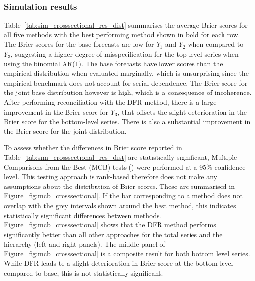 \documentclass[a4paper,review,12pt,authoryear]{elsarticle}
\theoremstyle{definition}
\begin{document}
    \subsubsection{Simulation results}
    Table~\ref{tab:sim_crosssectional_res_dist} summarises the average Brier scores for all five methods with the best performing  method shown in bold for each row. The Brier scores for the base forecasts are low for $Y_1$ and $Y_2$ when compared to $Y_3$, suggesting a higher degree of misspecification for the top level series when using the binomial AR(1). The base forecasts have lower scores than the empirical distribution when evaluated marginally, which is unsurprising since the empirical benchmark does not account for serial dependence. The Brier score for the joint base distribution however is high, which is a consequence of incoherence. After performing reconciliation with the DFR method, there is a large improvement in the Brier score for $Y_3$, that offsets the slight deterioration in the Brier score for the bottom-level series. There is also a substantial improvement in the Brier score for the joint distribution.
    
    To assess whether the differences in Brier score reported in Table~\ref{tab:sim_crosssectional_res_dist} are statistically significant, Multiple Comparisons from the Best (MCB) tests (\citealp{koningM3CompetitionStatistical2005}) were performed at a 95\% confidence level.
    This testing approach is rank-based therefore does not make any assumptions about the distribution of Brier scores. These are summarised in Figure~\ref{fig:mcb_crosssectional}. If the bar corresponding to a method does not overlap with the grey intervals shown around the best method, this indicates statistically significant differences between methods.
    Figure~\ref{fig:mcb_crosssectional} shows that the DFR method performs significantly better than all other approaches for the total series and the hierarchy (left and right panels). The middle panel of Figure~\ref{fig:mcb_crosssectional} is a composite result for both bottom level series. While DFR leads to a slight deterioration in Brier score at the bottom level compared to base, this is not statistically significant.
\end{document}
